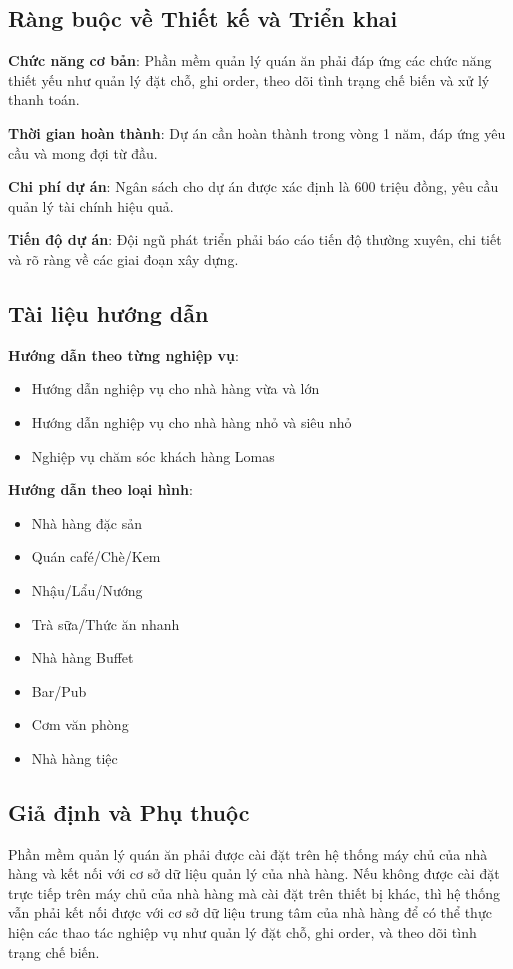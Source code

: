 \subsection{Ràng buộc về Thiết kế và Triển khai}
\vspace{0.5em}
\textbf{Chức năng cơ bản}: Phần mềm quản lý quán ăn phải đáp ứng các chức năng thiết yếu như quản lý đặt chỗ, ghi order, theo dõi tình trạng chế biến và xử lý thanh toán.

\textbf{Thời gian hoàn thành}: Dự án cần hoàn thành trong vòng 1 năm, đáp ứng yêu cầu và mong đợi từ đầu.

\textbf{Chi phí dự án}: Ngân sách cho dự án được xác định là 600 triệu đồng, yêu cầu quản lý tài chính hiệu quả.

\textbf{Tiến độ dự án}: Đội ngũ phát triển phải báo cáo tiến độ thường xuyên, chi tiết và rõ ràng về các giai đoạn xây dựng.


\subsection{Tài liệu hướng dẫn}
\vspace{0.5em}
\textbf{Hướng dẫn theo từng nghiệp vụ}:
\begin{itemize}[leftmargin=1.5cm, label={--}]
    \item Hướng dẫn nghiệp vụ cho nhà hàng vừa và lớn
    \item Hướng dẫn nghiệp vụ cho nhà hàng nhỏ và siêu nhỏ
    \item Nghiệp vụ chăm sóc khách hàng Lomas
\end{itemize}

\textbf{Hướng dẫn theo loại hình}:
\begin{itemize}[leftmargin=1.5cm, label={--}]
    \item Nhà hàng đặc sản
    \item Quán café/Chè/Kem
    \item Nhậu/Lẩu/Nướng
    \item Trà sữa/Thức ăn nhanh
    \item Nhà hàng Buffet
    \item Bar/Pub
    \item Cơm văn phòng
    \item Nhà hàng tiệc
\end{itemize}

\subsection{Giả định và Phụ thuộc}
\vspace{0.5em}
Phần mềm quản lý quán ăn phải được cài đặt trên hệ thống máy chủ của nhà hàng và kết nối với cơ sở dữ liệu quản lý của nhà hàng. Nếu không được cài đặt trực tiếp trên máy chủ của nhà hàng mà cài đặt trên thiết bị khác, thì hệ thống vẫn phải kết nối được với cơ sở dữ liệu trung tâm của nhà hàng để có thể thực hiện các thao tác nghiệp vụ như quản lý đặt chỗ, ghi order, và theo dõi tình trạng chế biến.



